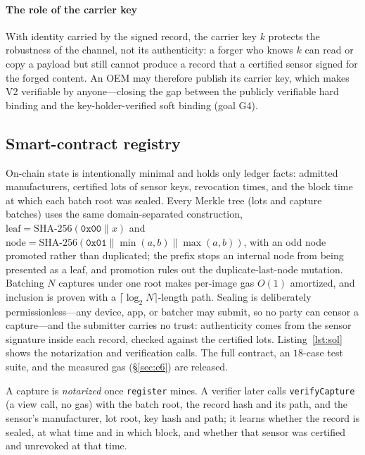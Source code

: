 \documentclass[journal]{IEEEtran}
\newcommand{\pr}{\textup{\textsc{PixelRoot}}}
\begin{document}
\paragraph{The role of the carrier key}
With identity carried by the signed record, the carrier key $k$ protects the
robustness of the channel, not its authenticity: a forger who knows $k$ can read
or copy a payload but still cannot produce a record that a certified sensor
signed for the forged content. An OEM may therefore publish its carrier key,
which makes V2 verifiable by anyone---closing the gap between the publicly
verifiable hard binding and the key-holder-verified soft binding (goal G4).

\subsection{Smart-contract registry}\label{sec:contract}
On-chain state is intentionally minimal and holds only ledger facts: admitted
manufacturers, certified lots of sensor keys, revocation times, and the block
time at which each batch root was sealed. Every Merkle tree (lots and capture
batches) uses the same domain-separated construction,
$\mathrm{leaf}=\mathrm{SHA\text{-}256}(\texttt{0x00}\|x)$ and
$\mathrm{node}=\mathrm{SHA\text{-}256}(\texttt{0x01}\|\min(a,b)\|\max(a,b))$, with an
odd node promoted rather than duplicated; the prefix stops an internal node from
being presented as a leaf, and promotion rules out the duplicate-last-node
mutation. Batching $N$ captures under one root makes per-image gas $O(1)$
amortized, and inclusion is proven with a $\lceil\log_2 N\rceil$-length path.
Sealing is deliberately permissionless---any device, app, or batcher may submit,
so no party can censor a capture---and the submitter carries no trust:
authenticity comes from the sensor signature inside each record, checked against
the certified lots. \ifshort\else Listing~\ref{lst:sol} shows the notarization and
verification calls. \fi The full contract, an $18$-case test suite, and the measured
gas (\S\ref{sec:e6}) are released.

\ifshort\else

\fi

A capture is \emph{notarized} once \texttt{register} mines. A verifier
later calls \texttt{verifyCapture} (a view call, no gas) with the batch root, the
record hash and its path, and the sensor's manufacturer, lot root, key hash and
path; it learns whether the record is sealed, at what time and in which block,
and whether that sensor was certified and unrevoked at that time.
\end{document}
